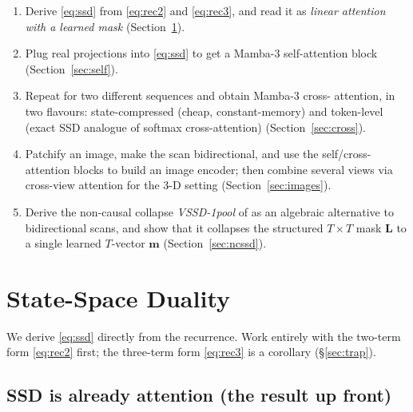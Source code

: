 \documentclass[11pt,a4paper]{article}
\begin{document}
\begin{enumerate}
  \item Derive \eqref{eq:ssd} from \eqref{eq:rec2} and
        \eqref{eq:rec3}, and read it as \emph{linear attention with a
        learned mask} (Section~\ref{sec:ssd}).
  \item Plug real projections into \eqref{eq:ssd} to get a Mamba-3
        self-attention block (Section~\ref{sec:self}).
  \item Repeat for two different sequences and obtain Mamba-3 cross-
        attention, in two flavours: state-compressed (cheap,
        constant-memory) and token-level (exact SSD analogue of
        softmax cross-attention) (Section~\ref{sec:cross}).
  \item Patchify an image, make the scan bidirectional, and use the
        self/cross-attention blocks to build an image encoder; then
        combine several views via cross-view attention for the 3-D
        setting (Section~\ref{sec:images}).
  \item Derive the non-causal collapse \emph{VSSD-1pool} of \cite{vssd}
        as an algebraic alternative to bidirectional scans, and show
        that it collapses the structured $T\times T$ mask $\bm{L}$ to
        a single learned $T$-vector $\bm{m}$
        (Section~\ref{sec:ncssd}).
\end{enumerate}

\section{State-Space Duality}
\label{sec:ssd}

We derive \eqref{eq:ssd} directly from the recurrence. Work entirely
with the two-term form \eqref{eq:rec2} first; the three-term form
\eqref{eq:rec3} is a corollary (\S\ref{sec:trap}).

\subsection{SSD is already attention (the result up front)}
\end{document}
